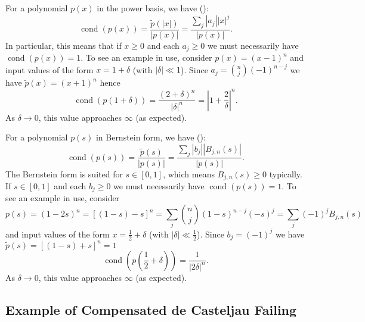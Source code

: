 \documentclass[letterpaper,10pt]{article}
\newcommand{\cond}[1]{\operatorname{cond}\left(#1\right)}
\begin{document}
For a polynomial \(p(x)\) in the power basis, we have
(\cite{langlois_et_al:DSP:2006:442}):
\begin{equation}
\cond{p(x)} = \frac{\widetilde{p}\left(\left|x\right|\right)}{
  \left|p(x)\right|} = \frac{\sum_j \left|a_j\right| \left|x\right|^j}{
  \left|p(x)\right|}.
\end{equation}
In particular, this means that if \(x \geq 0\) and each \(a_j \geq 0\)
we must necessarily have \(\cond{p(x)} = 1\). To see an example in use,
consider \(p(x) = (x - 1)^n\) and input values of the form \(x = 1 + \delta\)
(with \(\left|\delta\right| \ll 1\)). Since \(a_j = \binom{n}{j} (-1)^{n - j}\)
we have \(\widetilde{p}(x) = (x + 1)^n\) hence
\begin{equation}
\cond{p\left(1 + \delta\right)} = \frac{(2 + \delta)^n}{
  \left|\delta\right|^n} = \left|1 + \frac{2}{\delta}\right|^n.
\end{equation}
As \(\delta \to 0\), this value approaches \(\infty\) (as expected).

For a polynomial \(p(s)\) in Bernstein form, we have (\cite{Jiang2010}):
\begin{equation}
\cond{p(s)} = \frac{\widetilde{p}\left(s\right)}{
  \left|p(s)\right|} = \frac{\sum_j \left|b_j\right| \left|B_{j, n}(s)\right|}{
  \left|p(s)\right|}.
\end{equation}
The Bernstein form is suited for \(s \in \left[0, 1\right]\), which means
\(B_{j, n}(s) \geq 0\) typically. If \(s \in \left[0, 1\right]\) and each
\(b_j \geq 0\) we must necessarily have \(\cond{p(s)} = 1\). To see an
example in use, consider
\begin{equation}
p(s) = (1 - 2s)^n = \left[(1 - s) - s\right]^n = \sum_j \binom{n}{j}
(1 - s)^{n - j} (-s)^j = \sum_j (-1)^j B_{j, n}(s)
\end{equation}
and input values of the form \(x = \frac{1}{2} + \delta\)
(with \(\left|\delta\right| \ll \frac{1}{2}\)). Since \(b_j = (-1)^j\)
we have \(\widetilde{p}(s) = \left[(1 - s) + s\right]^n = 1\)
\begin{equation}
\cond{p\left(\frac{1}{2} + \delta\right)} = \frac{1}{
  \left|2\delta\right|^n}.
\end{equation}
As \(\delta \to 0\), this value approaches \(\infty\) (as expected).

\subsection{Example of Compensated de Casteljau Failing}
\end{document}

